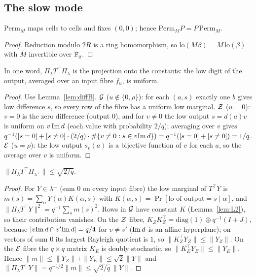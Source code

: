 \subsection{The slow mode}
\begin{lemma}[L1]\label{lem:L1}
$\mathrm{Perm}_M$ maps cells to cells and fixes $(0,0)$; hence $\mathrm{Perm}_MP=P\,\mathrm{Perm}_M$.
\end{lemma}
\begin{proof}
Reduction modulo $2R$ is a ring homomorphism, so $\mathrm{lo}(M\beta)=\bar M\,\mathrm{lo}(\beta)$ with $\bar M$ invertible over $\mathbb{F}_q$.
\end{proof}

\begin{lemma}[L2]\label{lem:L2}
In one word, $\Pi_\lambda T^\top\Pi_\lambda$ is the projection onto the constants: the low digit of the output, averaged over an input fibre
$f_u$, is uniform.
\end{lemma}
\begin{proof}
Use Lemma~\ref{lem:diffB}. $\mathcal{G}$ ($u\notin\{0,\rho\}$): for each $(a,s)$ exactly one $b$ gives low difference $s$, so every row of the fibre has a uniform
low marginal. $\mathcal{Z}$ ($u=0$): $v=0$ is the zero difference (output $0$), and for $v\ne0$ the low output $s=d(a)v$ is uniform on $v\,\mathrm{Im}\, d$ (each value
with probability $2/q$); averaging over $v$ gives $q^{-1}([s=0]+[s\ne0]\cdot(2/q)\cdot\#\{v\ne0:s\in v\mathrm{Im}\, d\})=q^{-1}([s=0]+[s\ne0])=1/q$.
$\mathcal{E}$ ($u=\rho$): the low output $s_v(a)$ is a bijective function of $v$ for each $a$, so the average over $v$ is uniform.
\end{proof}

\begin{lemma}[L3]\label{lem:L3}
$\|\Pi_\lambda T^\top\Pi_{\lambda^\perp}\|\le\sqrt{2/q}$.
\end{lemma}
\begin{proof}
For $Y\in\lambda^\perp$ (sum $0$ on every input fibre) the low marginal of $T^\top Y$ is $m(s)=\sum_\alpha Y(\alpha)K(\alpha,s)$ with
$K(\alpha,s)=\Pr[\mathrm{lo}\text{ of output}=s\mid\alpha]$, and $\|\Pi_\lambda T^\top Y\|^2=q^{-1}\sum_sm(s)^2$. Rows in $\mathcal{G}$ have constant $K$ (Lemma~\ref{lem:L2}),
so their contribution vanishes. On the $\mathcal{Z}$ fibre, $K_ZK_Z^\top=\mathrm{diag}(1)\oplus q^{-1}(I+J)$, because $|v\mathrm{Im}\, d\cap v'\mathrm{Im}\, d|=q/4$ for $v\ne v'$ ($\mathrm{Im}\, d$ is
an affine hyperplane); on vectors of sum $0$ its largest Rayleigh quotient is $1$, so $\|K_Z^\top Y_Z\|\le\|Y_Z\|$. On the $\mathcal{E}$ fibre
the $q\times q$ matrix $K_E$ is doubly stochastic, so $\|K_E^\top Y_E\|\le\|Y_E\|$. Hence $\|m\|\le\|Y_Z\|+\|Y_E\|\le\sqrt2\|Y\|$ and
$\|\Pi_\lambda T^\top Y\|=q^{-1/2}\|m\|\le\sqrt{2/q}\,\|Y\|$.
\end{proof}

